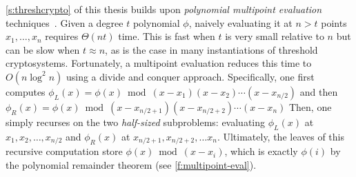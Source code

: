 {\begin{sidewaysfigure}
\caption{A multipoint evaluation of polynomial $\phi$ at points $\{1,2,\dots, 8\}$.
    Each node is expressed as $a = q \cdot b + r$: i.e., a polynomial $a$ is being divided by $b$, resulting in a \textit{quotient} $q$ and a \textit{remainder} $r$.
    In the root node, $\phi$ is divided by the root \textit{accumulator} $\prod_{i\in[8]}(x-i)$, obtaining a quotient $q_{1,8}$ and a remainder $r_{1,8}$.
    Then, the root's left child divides $r_{1,8}$ by $(x-1)\cdots(x-4)$ while the right child divides it by $(x-5)\cdots(x-8)$.
    The process is repeated recursively on the resulting $r_{1,4}$ and $r_{5,8}$ remainders.
    The remainders $r_{i,i}$ in the leaves are the evaluations $\phi(i)$.}
\label{f:multipoint-eval}
\end{sidewaysfigure}
} %

\multipointEvalExample

\cref{s:threshcrypto} of this thesis builds upon \textit{polynomial multipoint evaluation} techniques~\cite{vG13ModernCh10}.
Given a degree $t$ polynomial $\phi$, naively evaluating it at $n > t$ points $x_1, \dots, x_n$ requires $\Theta(nt)$ time.
This is fast when $t$ is very small relative to $n$ but can be slow when $t \approx n$, as is the case in many instantiations of threshold cryptosystems.
Fortunately, a multipoint evaluation reduces this time to $O(n\log^2{n})$ using a divide and conquer approach.
Specifically, one first computes $\phi_L(x)=\phi(x) \bmod (x-x_1)(x-x_2)\cdots(x-x_{n/2})$ and then $\phi_R(x)=\phi(x) \bmod (x-x_{n/2+1})(x-x_{n/2+2})\cdots(x-x_n)$
Then, one simply recurses on the two \textit{half-sized} subproblems: evaluating $\phi_L(x)$ at $x_1, x_2, \dots, x_{n/2}$ and $\phi_R(x)$ at $x_{n/2+1}, x_{n/2+2},\dots x_n$.
Ultimately, the leaves of this recursive computation store $\phi(x) \bmod (x-x_i)$, which is exactly $\phi(i)$ by the polynomial remainder theorem (see \cref{f:multipoint-eval}).

